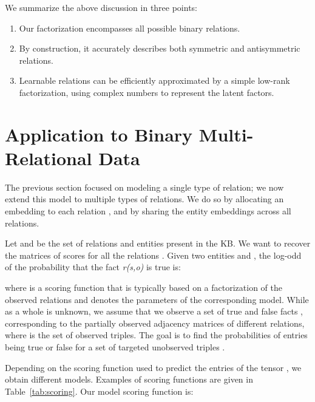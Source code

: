 \documentclass{article}
\begin{document}
We summarize the above discussion in three points:

\begin{enumerate}
    \item Our factorization encompasses all possible binary relations.
    \item By construction, it accurately describes both symmetric and antisymmetric relations.
    \item Learnable relations can be efficiently approximated
by a simple low-rank factorization, using complex numbers to represent the latent factors.
\end{enumerate}



























\section{Application to Binary Multi-Relational Data}

The previous section focused on modeling a single type of relation; we now extend this model to multiple types of relations. 
We do so by allocating an embedding  to each relation , and by sharing the entity embeddings across all relations.


Let  and  be the set of relations and entities present in the KB. We want to recover the matrices of scores  for all the relations .
Given two entities  and  , the log-odd of the probability that the fact \emph{r(s,o)} is true is:

where  is a scoring function that is typically based on a factorization of the observed relations and  denotes the parameters of the corresponding model. While  as a whole is unknown, we 
assume that we observe a set of true and false facts 
, corresponding to the partially observed adjacency matrices of different relations, where  
is the set of observed triples. The goal is to find the probabilities of entries 
 being true or false for a set of targeted unobserved 
triples .

Depending on the scoring function  used to predict the entries of the
tensor , we obtain different models. Examples of scoring functions are given in Table~\ref{tab:scoring}. Our model scoring function is:
\end{document}
